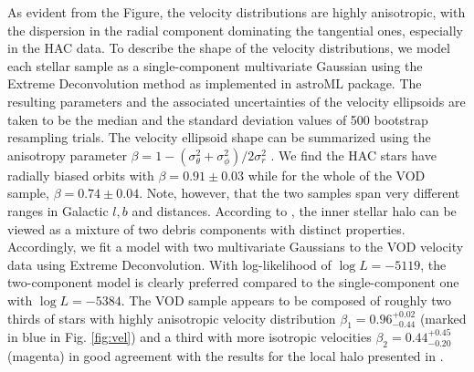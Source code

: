 \documentclass[fleqn,usenatbib]{mnras}
\begin{document}
As evident from the Figure, the velocity distributions are highly
anisotropic, with the dispersion in the radial component dominating
the tangential ones, especially in the HAC data. To describe the shape
of the velocity distributions, we model each stellar sample as a
single-component multivariate Gaussian using the Extreme
Deconvolution \citep{ED} method as implemented in $\mathrm{astroML}$
\citep{astroML} package. The resulting parameters and the associated
uncertainties of the velocity ellipsoids are taken to be the median
and the standard deviation values of 500 bootstrap resampling trials.
The velocity ellipsoid shape can be summarized using the anisotropy
parameter $\beta=1-(\sigma^2_{\theta}+\sigma^2_{\phi})/2\sigma^2_r$
\citep[see][]{Binney2008}. We find the HAC stars have radially biased
orbits with $\beta = 0.91 \pm 0.03$ while for the whole of the VOD
sample, $\beta = 0.74 \pm 0.04$. Note, however, that the two samples
span very different ranges in Galactic $l,b$ and distances. According
to \citet{Belokurov2018}, the inner stellar halo can be viewed as a
mixture of two debris components with distinct
properties. Accordingly, we fit a model with two multivariate
Gaussians to the VOD velocity data using Extreme Deconvolution. 
With log-likelihood of $\log L = -5119$, the
two-component model is clearly preferred compared to the
single-component one with $\log L = -5384$. The VOD sample appears to
be composed of roughly two thirds of stars with highly anisotropic
velocity distribution $\beta_{1}=
0.96^{+0.02}_{-0.44}$ (marked in blue in Fig. \ref{fig:vel}) and a
third with more isotropic velocities $\beta_{2}=0.44^{+0.45}_{-0.20}$ (magenta) in good
agreement with the results for the local halo presented in
\citet{Belokurov2018}.
%
\end{document}

